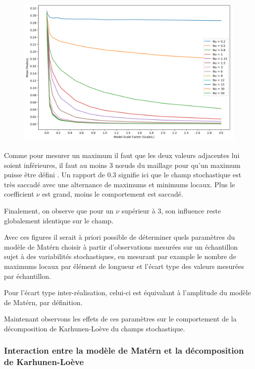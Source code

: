 \documentclass[a4paper,10pt]{article}
\begin{document}
\begin{figure}[H]
   \centering   
   \noindent \includegraphics[width = \linewidth]{peakScale.png}
      \caption{}
         \label{peakScale}
\end{figure}

Comme pour mesurer un maximum il faut que les deux valeurs adjacentes lui soient inférieures, il faut au moins 3 nœuds du maillage pour qu'un maximum puisse être défini . Un rapport de 0.3 signifie ici que le champ stochastique est très saccadé avec une alternance de maximums et minimums locaux. Plus le coefficient $\nu$ est grand, moins le comportement est saccadé. \par \bigskip

Finalement, on observe que pour un $\nu$ supérieur à 3, son influence reste globalement identique sur le champ. \par \smallskip

Avec ces figures il serait à priori possible de déterminer quels paramètres du modèle de Matérn choisir à partir d'observations mesurées sur un échantillon sujet à des variabilités stochastiques, en mesurant par example le nombre de maximums locaux par élément de longueur et l'écart type des valeurs mesurées par échantillon. \par \smallskip 

Pour l’écart type inter-réalisation, celui-ci est équivalant à l'amplitude du modèle de Matérn, par définition.  \par

Maintenant observons les effets de ces paramètres sur le comportement de la décomposition de Karhunen-Loève du champs stochastique. 

\subsubsection{Interaction entre la modèle de Matérn et la décomposition de Karhunen-Loève}
\end{document}
